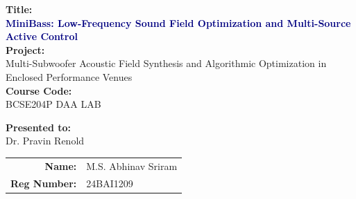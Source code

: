 \documentclass[11pt,a4paper,titlepage]{article}
\begin{document}
\begin{titlepage}
    \centering
    \vspace*{1.5cm}
    
    {\Large \textbf{Title:}}\\[0.6em]
    {\Huge \bfseries \textcolor{navy}{MiniBass: Low-Frequency Sound Field Optimization and Multi-Source Active Control}}\\[2.0cm]
    
    {\Large \textbf{Project:}}\\[0.6em]
    {\LARGE Multi-Subwoofer Acoustic Field Synthesis and Algorithmic Optimization in Enclosed Performance Venues}\\[2.0cm]
    
    {\Large \textbf{Course Code:}}\\[0.6em]
    {\LARGE BCSE204P DAA LAB}\\[2.0cm]
    
    \vfill
    
    \begin{minipage}{0.85\textwidth}
        \centering
        {\Large \textbf{Presented to:}}\\[0.6em]
        {\LARGE Dr. Pravin Renold}\\[2.5cm]
        
        \begin{tabular}{rl}
            \Large \textbf{Name:} & \Large M.S. Abhinav Sriram \\[1.0em]
            \Large \textbf{Reg Number:} & \Large 24BAI1209 \\
        \end{tabular}
    \end{minipage}
    
    \vspace*{1.5cm}
\end{titlepage}

\tableofcontents
\newpage
\listoffigures
\vspace{1.0em}
\listoftables
\newpage

\end{document}
